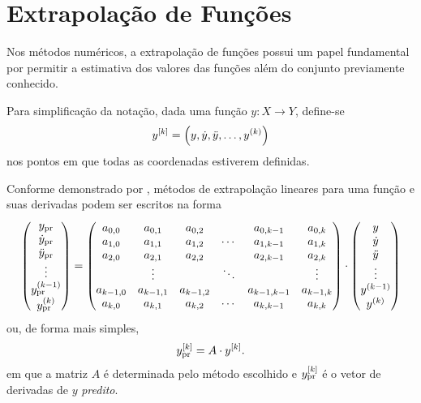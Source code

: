 \section{Extrapolação de Funções}
\label{sec:extrapolation}

Nos métodos numéricos, a extrapolação de funções possui um papel fundamental por permitir a estimativa dos valores das funções além do conjunto previamente conhecido.

Para simplificação da notação, dada uma função \(y: X\to Y\), define-se
\[\drvec{\taylorOrder}{y} = \pqty{y, \deriv{1}{y}, \deriv{2}{y}, \dots, \deriv{\taylorOrder}{y}}\]
nos pontos em que todas as coordenadas estiverem definidas.

Conforme demonstrado por , métodos de extrapolação lineares para uma função e suas derivadas podem ser escritos na forma
\[
\begin{pmatrix}
	\predicted{y} \\
	\predicted{\deriv{1}{y}} \\
	\predicted{\deriv{2}{y}} \\
	\vdots \\
	\predicted{\deriv{\taylorOrder-1}{y}} \\
	\predicted{\deriv{\taylorOrder}{y}}
\end{pmatrix}
=
\begin{pmatrix}
	a_{0,0} & a_{0,1} & a_{0,2} &  & a_{0,\taylorOrder-1} & a_{0,\taylorOrder} \\
	a_{1,0} & a_{1,1} & a_{1,2} & \cdots & a_{1,\taylorOrder-1} & a_{1,\taylorOrder} \\
	a_{2,0} & a_{2,1} & a_{2,2} &  & a_{2,\taylorOrder-1} & a_{2,\taylorOrder} \\
     & \vdots & & \ddots & & \vdots \\
    a_{\taylorOrder-1,0} & a_{\taylorOrder-1,1} & a_{\taylorOrder-1,2} &  & a_{\taylorOrder-1,\taylorOrder-1} & a_{\taylorOrder-1,\taylorOrder} \\
    a_{\taylorOrder,0} & a_{\taylorOrder,1} & a_{\taylorOrder,2} & \cdots & a_{\taylorOrder,\taylorOrder-1} & a_{\taylorOrder,\taylorOrder}
\end{pmatrix}
\cdot
\begin{pmatrix}
	y \\
	\deriv{1}{y} \\
	\deriv{2}{y} \\
	\vdots \\
	\deriv{\taylorOrder-1}{y} \\
	\deriv{\taylorOrder}{y}
\end{pmatrix}
\]
ou, de forma mais simples,
\begin{equation}
	\drvec{\taylorOrder}{\predicted{y}} = A \cdot \drvec{\taylorOrder}{y}.
\end{equation}
em que a matriz \(A\) é determinada pelo método escolhido e \(\drvec{\taylorOrder}{\predicted{y}}\) é o vetor de derivadas de \(y\) \textit{predito}.


